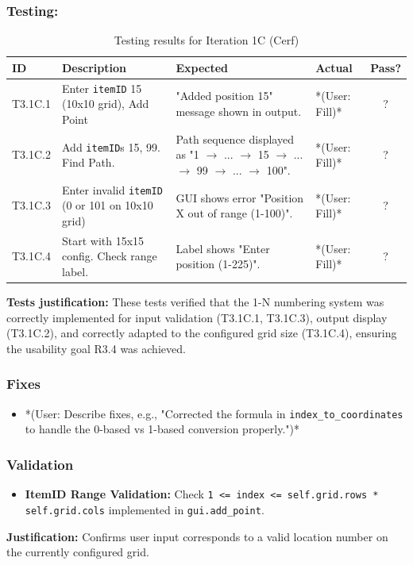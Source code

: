 \subsubsection{Testing:}
\begin{table}[htbp]
	\centering
	\begin{tabularx}{\textwidth}{|l|X|p{4.5cm}|p{1.5cm}|c|}
		\hline
		\textbf{ID} & \textbf{Description} & \textbf{Expected} & \textbf{Actual} & \textbf{Pass?} \\
		\hline
		T3.1C.1 & Enter \verb|itemID| 15 (10x10 grid), Add Point & "Added position 15" message shown in output. & *(User: Fill)* & ? \\
		\hline
		T3.1C.2 & Add \verb|itemID|s 15, 99. Find Path. & Path sequence displayed as "1 $ \rightarrow $ ... $ \rightarrow $ 15 $ \rightarrow $ ... $ \rightarrow $ 99 $ \rightarrow $ ... $ \rightarrow $ 100". & *(User: Fill)* & ? \\
		\hline
		T3.1C.3 & Enter invalid \verb|itemID| (0 or 101 on 10x10 grid) & GUI shows error "Position X out of range (1-100)". & *(User: Fill)* & ? \\
		\hline
		T3.1C.4 & Start with 15x15 config. Check range label. & Label shows "Enter position (1-225)". & *(User: Fill)* & ? \\
		\hline
	\end{tabularx}
	\caption{Testing results for Iteration 1C (Cerf)}
\end{table}
\textbf{Tests justification:} These tests verified that the 1-N numbering system was correctly implemented for input validation (T3.1C.1, T3.1C.3), output display (T3.1C.2), and correctly adapted to the configured grid size (T3.1C.4), ensuring the usability goal R3.4 was achieved.

\subsubsection{Fixes}
\begin{itemize}
	\item *(User: Describe fixes, e.g., "Corrected the formula in \verb|index_to_coordinates| to handle the 0-based vs 1-based conversion properly.")*
\end{itemize}

\subsubsection{Validation}
\begin{itemize}
	\item \textbf{ItemID Range Validation:} Check \verb|1 <= index <= self.grid.rows * self.grid.cols| implemented in \verb|gui.add_point|.
\end{itemize}
\textbf{Justification:} Confirms user input corresponds to a valid location number on the currently configured grid.



